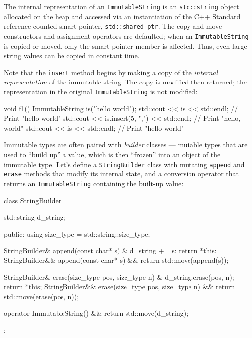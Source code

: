 \noindent The internal representation of an \lstinline!ImmutableString! is an
\lstinline!std::string! object allocated on the heap and accessed via an
instantiation of the C++ Standard reference-counted smart pointer,
\lstinline!std::shared_ptr!. The copy and move constructors and assignment
operators are defaulted; when an \lstinline!ImmutableString! is copied or
moved, only the smart pointer member is affected. Thus, even large
string values can be copied in constant time.

Note that the \lstinline!insert! method begins by making a copy of the
\emph{internal representation} of the immutable string. The copy is
modified then returned; the representation in the original
\lstinline!ImmutableString! is not modified:

\begin{emcppslisting}
void f1()
{
    ImmutableString is("hello world");
    std::cout << is << std::endl;                 // Print "hello world"
    std::cout << is.insert(5, ",") << std::endl;  // Print "hello, world"
    std::cout << is << std::endl;                 // Print "hello world"
}
\end{emcppslisting}
    

\noindent Immutable types are often paired with \emph{builder} classes --- mutable
types that are used to ``build up'' a value, which is then ``frozen''
into an object of the immutable type. Let's define a
\lstinline!StringBuilder! class with mutating \lstinline!append! and
\lstinline!erase! methods that modify its internal state, and a conversion
operator that returns an \lstinline!ImmutableString! containing the
built-up value:

\begin{emcppslisting}
class StringBuilder
{
    std::string d_string;

public:
    using size_type = std::string::size_type;

    StringBuilder&  append(const char* s) &  { d_string += s; return *this; }
    StringBuilder&& append(const char* s) && { return std::move(append(s)); }

    StringBuilder&  erase(size_type pos, size_type n) &
    {
        d_string.erase(pos, n);
        return *this;
    }
    StringBuilder&& erase(size_type pos, size_type n) &&
    {
        return std::move(erase(pos, n));
    }

    operator ImmutableString() && { return std::move(d_string); }
};
\end{emcppslisting}
    


